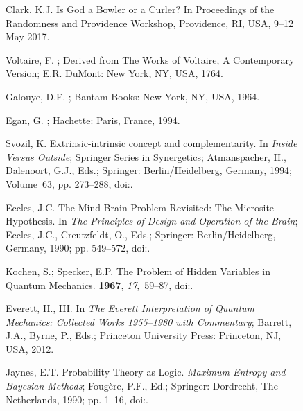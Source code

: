 \documentclass[entropy,article,accept,oneauthor,pdftex]{Definitions/mdpi}
\begin{document}
\begin{figure}[H]
\begin{thebibliography}{999}
Clark, K.J.
\newblock Is {G}od a Bowler or a Curler?
\newblock In Proceedings of the Randomness and Providence Workshop, Providence, RI, USA, 9--12 May 2017.

Voltaire, F.
; Derived from The Works of Voltaire, A Contemporary Version; E.R. DuMont: New York, NY, USA, 1764.

Galouye, D.F.
; Bantam Books: New York, NY, USA, 1964.

Egan, G.
; Hachette: Paris, France, 1994.

Svozil, K.
\newblock Extrinsic-intrinsic concept and complementarity. In {\em Inside
  Versus Outside}; Springer Series in Synergetics; Atmanspacher, H., Dalenoort, G.J., Eds.; Springer: Berlin/Heidelberg, Germany, 1994; Volume~63, pp. 273--288, doi:{\href{https://doi.org/10.1007/978-3-642-48647-0\_15}{}}.

Eccles, J.C.
\newblock The Mind-Brain Problem Revisited: The Microsite Hypothesis. In {\em
  The Principles of Design and Operation of the Brain}; Eccles, J.C., Creutzfeldt, O., Eds.; Springer: Berlin/Heidelberg, Germany, 1990; pp. 549--572, doi:{\href{https://doi.org/10.1017/S0960129510000344}{}}.

Kochen, S.; Specker, E.P.
\newblock The Problem of Hidden Variables in Quantum Mechanics.
 {\bf 1967}, {\em 17},~59--87, doi:{\href{https://doi.org/10.1512/iumj.1968.17.17004}{}}.

{Everett}, H., III.
\newblock In {\em The {E}verett Interpretation of Quantum Mechanics: Collected
  Works 1955--1980 with Commentary}; Barrett, J.A., Byrne, P., Eds.; Princeton University Press: Princeton, NJ, USA, 2012.

Jaynes, E.T.
\newblock Probability Theory as Logic.
\newblock  \emph{Maximum Entropy and {B}ayesian Methods}; Foug{\`e}re, P.F., Ed.;
  Springer: Dordrecht, The Netherlands, 1990; pp. 1--16, doi:{\href{https://doi.org/10.1007/978-94-009-0683-9\_1}{}}.


\end{thebibliography}
\end{figure}
\end{document}
